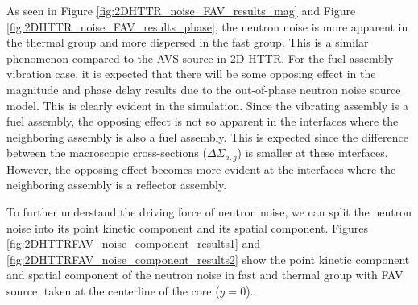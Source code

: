 As seen in Figure \ref{fig:2DHTTR_noise_FAV_results_mag} and Figure \ref{fig:2DHTTR_noise_FAV_results_phase}, the neutron noise is more apparent in the thermal group and more dispersed in the fast group. This is a similar phenomenon compared to the AVS source in 2D HTTR. For the fuel assembly vibration case, it is expected that there will be some opposing effect in the magnitude and phase delay results due to the out-of-phase neutron noise source model. This is clearly evident in the simulation. Since the vibrating assembly is a fuel assembly, the opposing effect is not so apparent in the interfaces where the neighboring assembly is also a fuel assembly. This is expected since the difference between the macroscopic cross-sections  ($\Delta \Sigma_{a,g}$) is smaller at these interfaces. However, the opposing effect becomes more evident at the interfaces where the neighboring assembly is a reflector assembly. 

To further understand the driving force of neutron noise, we can split the neutron noise into its point kinetic component and its spatial component. Figures \ref{fig:2DHTTRFAV_noise_component_results1} and \ref{fig:2DHTTRFAV_noise_component_results2} show the point kinetic component and spatial component of the neutron noise in fast and thermal group with FAV source, taken at the centerline of the core ($y=0$).

